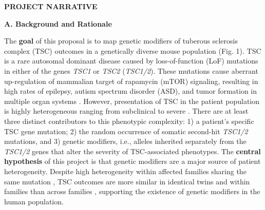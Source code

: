 \documentclass[
  12pt,
]{article}
\author{}
\date{\vspace{-2.5em}}
\begin{document}
\textbf{PROJECT NARRATIVE}

\textbf{A. Background and Rationale}

The \textbf{goal} of this proposal is to map genetic modifiers of
tuberous sclerosis complex (TSC) outcomes in a genetically diverse mouse
population (Fig. 1). TSC is a rare autosomal dominant disease caused by
loss-of-function (LoF) mutations in either of the genes \textit{TSC1} or
\textit{TSC2} (\textit{TSC1/2}). These mutations cause aberrant
up-regulation of mammalian target of rapamycin (mTOR) signaling,
resulting in high rates of epilepsy, autism spectrum disorder (ASD), and
tumor formation in multiple organ systems \cite{17005952}. However,
presentation of TSC in the patient population is highly heterogeneous
ranging from subclinical to severe
\cite{gomez_tuberous_1999, 8423606, 17005952, 8057044, 29687738, 28127866, 29926239}.
There are at least three distinct contributors to this phenotypic
complexity: 1) a patient's specific TSC gene mutation; 2) the random
occurrence of somatic second-hit \textit{TSC1/2} mutations, and 3)
genetic modifiers, i.e., alleles inherited separately from the
\textit{TSC1/2} genes that alter the severity of TSC-associated
phenotypes. The \textbf{central hypothesis} of this project is that
genetic modifiers are a major source of patient heterogeneity. Despite
high heterogeneity within affected families sharing the same mutation
\cite{29687738, 28127866, 29926239}, TSC outcomes are more similar in
identical twins and within families than across families
\cite{18174550}, supporting the existence of genetic modifiers in the
human population.
\end{document}
